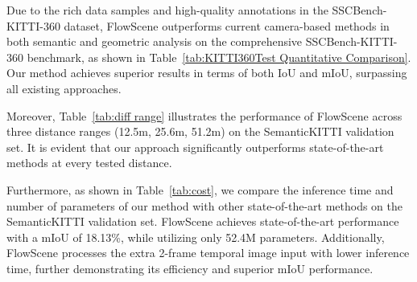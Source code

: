 Due to the rich data samples and high-quality annotations in the SSCBench-KITTI-360 dataset, FlowScene outperforms current camera-based methods in both semantic and geometric analysis on the comprehensive SSCBench-KITTI-360 benchmark, as shown in Table~\ref{tab:KITTI360Test Quantitative Comparison}. Our method achieves superior results in terms of both IoU and mIoU, surpassing all existing approaches.

Moreover, Table~\ref{tab:diff range} illustrates the performance of FlowScene across three distance ranges (12.5m, 25.6m, 51.2m) on the SemanticKITTI validation set. It is evident that our approach significantly outperforms state-of-the-art methods at every tested distance.

Furthermore, as shown in Table~\ref{tab:cost}, we compare the inference time and number of parameters of our method with other state-of-the-art methods on the SemanticKITTI validation set. FlowScene achieves state-of-the-art performance with a mIoU of 18.13\%, while utilizing only 52.4M parameters. Additionally, FlowScene processes the extra 2-frame temporal image input with lower inference time, further demonstrating its efficiency and superior mIoU performance.
\vspace{-5mm}
\begin{table}[t]
  \centering\small
{}
      \caption{Comparison of inference time and number of parameters.}
  \label{tab:cost}
  \vspace{-5mm}
\end{table}
